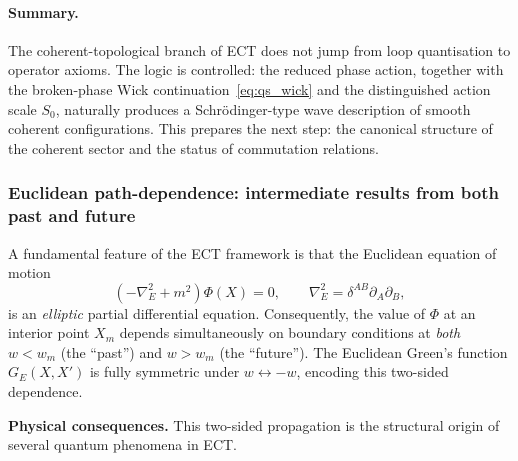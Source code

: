 \documentclass[11pt,a4paper]{article}
\numberwithin{equation}{section}
\begin{document}
\paragraph{Summary.}
The coherent-topological branch of ECT does not jump from loop
quantisation to operator axioms.
The logic is controlled: the reduced phase action, together with the
broken-phase Wick continuation~\eqref{eq:qs_wick} and the distinguished
action scale $S_0$, naturally produces a Schr\"odinger-type wave
description of smooth coherent configurations.
This prepares the next step: the canonical structure of the coherent
sector and the status of commutation relations.



\subsubsection{Euclidean path-dependence: intermediate
results from both past and future}
\label{sec:path_dependence}

A fundamental feature of the ECT framework is that the Euclidean
equation of motion
\begin{equation}
  \left(-\nabla^2_E + m^2\right)\Phi(X) = 0,
  \qquad \nabla^2_E = \delta^{AB}\partial_A\partial_B,
\end{equation}
is an \emph{elliptic} partial differential equation.  Consequently,
the value of $\Phi$ at an interior point $X_m$ depends simultaneously
on boundary conditions at \emph{both} $w < w_m$ (the ``past'') and
$w > w_m$ (the ``future'').  The Euclidean Green's function
$G_E(X,X')$ is fully symmetric under $w\leftrightarrow -w$, encoding
this two-sided dependence.

\textbf{Physical consequences.}
This two-sided propagation is the structural origin of several quantum
phenomena in ECT.
\end{document}
